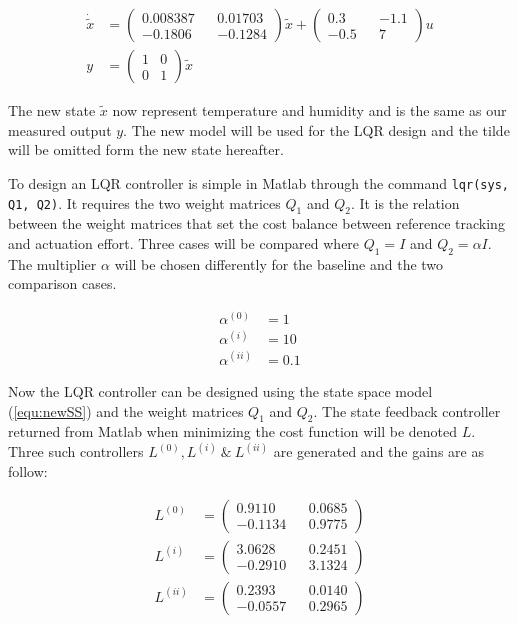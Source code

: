 \documentclass[a4paper, titlepage]{article}
\begin{document}
\begin{equation}
\begin{split}
\dot{\tilde{x}} &= 
\begin{pmatrix}
0.008387 && 0.01703 \\ -0.1806 && -0.1284
\end{pmatrix}\tilde{x}
+
\begin{pmatrix}
0.3 && -1.1 \\ -0.5 && 7
\end{pmatrix}u \\
y &= 
\begin{pmatrix}
1 & 0 \\ 0 & 1
\end{pmatrix}\tilde{x}
\end{split}
\label{equ:newSS}
\end{equation}

The new state $\tilde{x}$ now represent temperature and humidity and is the same as our measured output $y$.
The new model will be used for the LQR design and the tilde will be omitted form the new state hereafter.

To design an LQR controller is simple in Matlab through the command \verb|lqr(sys, Q1, Q2)|.
It requires the two weight matrices $Q_1$ and $Q_2$.
It is the relation between the weight matrices that set the cost balance between  reference tracking and actuation effort.
Three cases will be compared where $Q_1 = I$ and $Q_2 = \alpha I$.
The multiplier $\alpha$ will be chosen differently for the baseline and the two comparison cases.

\begin{equation}
\begin{split}
\alpha^{(0)} &= 1 \\
\alpha^{(i)} &= 10 \\
\alpha^{(ii)} &= 0.1
\end{split}
\end{equation}

Now the LQR controller can be designed using the state space model (\ref{equ:newSS}) and the weight matrices $Q_1$ and $Q_2$.
The state feedback controller returned from Matlab when minimizing the cost function will be denoted $L$.
Three such controllers $L^{(0)}, L^{(i)} \:\&\: L^{(ii)}$ are generated and the gains are as follow:

\begin{equation}
\begin{split}
L^{(0)} &= 
\begin{pmatrix}
0.9110 	&& 0.0685  \\
-0.1134 	&& 0.9775
\end{pmatrix} \\
L^{(i)} &= 
\begin{pmatrix}
3.0628 && 0.2451 \\
-0.2910 && 3.1324
\end{pmatrix} \\
L^{(ii)} &= 
\begin{pmatrix}
0.2393 && 0.0140 \\
-0.0557 && 0.2965
\end{pmatrix}
\end{split}
\label{equ:lqrCont}
\end{equation}
\end{document}
